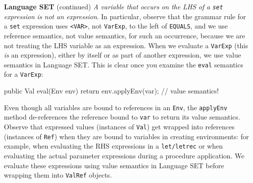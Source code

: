 \begin{minipage}[t]{\sw}
\slidenumber
\LARGE
{\bf Language SET} (continued)\exx
{\em A variable that occurs on the LHS
of a \verb'set' expression is not an expression}.
In particular, observe that the grammar rule
for a \verb'set' expression uses \verb'<VAR>', not \verb'VarExp',
to the left of \verb'EQUALS',
and we use reference semantics, not value semantics,
for such an occurrence,
because we are not treating the LHS variable as an expression.\exx
When we evaluate a \verb'VarExp'
(this {\em is} an expression),
either by itself or as part of another expression,
we use value semantics in Language SET.
This is clear once you examine the \verb'eval' semantics
for a \verb'VarExp':
{\Large
\begin{qv}
public Val eval(Env env) {
    return env.applyEnv(var); // value semantics!
}
\end{qv}
}
Even though all variables are bound to references in an \verb'Env',
the \verb'applyEnv' method de-references the reference bound to \verb'var'
to return its value semantics.\exx
Observe that expressed values (instances of \verb'Val')
get wrapped into references (instances of \verb'Ref')
when they are bound to variables in creating environments:
for example, when evaluating the RHS expressions in a \verb'let/letrec'
or when evaluating the actual parameter expressions
during a procedure application.
We evaluate these expressions
using value semantics in Language SET
before wrapping them into \verb'ValRef' objects.
\end{minipage}
\clearpage
